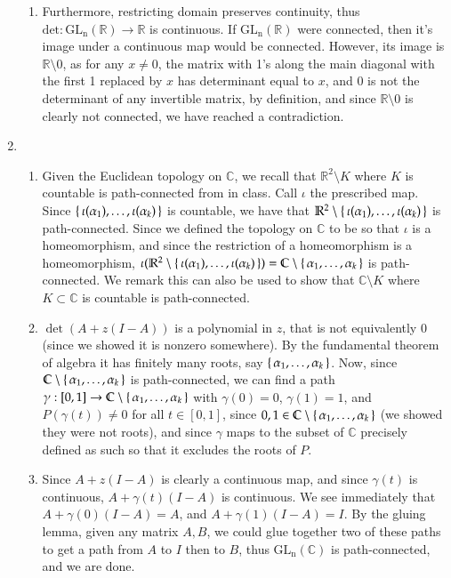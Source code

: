 \documentclass[12pt]{article}
\theoremstyle{definitionstyle}
\def\mbb#1{\mathbb{#1}}
\def \C{\mbb{C}}
\def \R{\mbb{R}}
\begin{document}
\begin{enumerate}[leftmargin=\labelsep]
\begin{enumerate}
			\item Furthermore, restricting domain preserves continuity, thus $\mathrm{det}: \mathrm{GL_n}(\R) \to \R$ is continuous. If $\mathrm{GL_n}(\R)$ were connected, then it's image under a continuous map would be connected. However, its image is $\R \setminus 0$, as for any $x \neq 0$, the matrix with 1's along the main diagonal with the first 1 replaced by $x$ has determinant equal to $x$, and 0 is not the determinant of any invertible matrix, by definition, and since $\R \setminus 0$ is clearly not connected, we have reached a contradiction.
		\end{enumerate}
		\item \begin{enumerate}
			\item Given the Euclidean topology on $\C$, we recall that $\R^2 \setminus K$ where $K$ is countable is path-connected from in class. Call $\iota$ the prescribed map. Since $\set{\iota(\alpha_1), \ldots, \iota(\alpha_k)}$ is countable, we have that $\R^2 \setminus \set{\iota(\alpha_1), \ldots, \iota(\alpha_k)}$ is path-connected. Since we defined the topology on $\C$ to be so that $\iota$ is a homeomorphism, and since the restriction of a homeomorphism is a homeomorphism, $\iota(\R^2 \setminus \set{\iota(\alpha_1), \ldots, \iota(\alpha_k)}) = \C \setminus \set{\alpha_1, \ldots, \alpha_k}$ is path-connected. We remark this can also be used to show that $\C \setminus K$ where $K \subset \C$ is countable is path-connected.
			
			\item $\det(A + z(I-A))$ is a polynomial in $z$, that is not equivalently 0 (since we showed it is nonzero somewhere). By the fundamental theorem of algebra it has finitely many roots, say $\set{\alpha_1, \ldots, \alpha_k}$. Now, since $\C \setminus \set{\alpha_1, \ldots, \alpha_k}$ is path-connected, we can find a path $\gamma: [0, 1] \to \C \setminus \set{\alpha_1, \ldots, \alpha_k}$ with $\gamma(0) = 0$, $\gamma(1) = 1$, and $P(\gamma(t)) \neq 0$ for all $t \in [0,1]$, since $0, 1 \in \C \setminus \set{\alpha_1, \ldots, \alpha_k}$ (we showed they were not roots), and since $\gamma$ maps to the subset of $\C$ precisely defined as such so that it excludes the roots of $P$.
			
			\item Since $A + z(I-A)$ is clearly a continuous map, and since $\gamma(t)$ is continuous, $A + \gamma(t)(I-A)$ is continuous. We see immediately that $A + \gamma(0)(I-A) = A$, and $A + \gamma(1)(I-A) = I$. By the gluing lemma, given any matrix $A, B$, we could glue together two of these paths to get a path from $A$ to $I$ then to $B$, thus $\mathrm{GL_n}(\C)$ is path-connected, and we are done.
		\end{enumerate}
	\end{enumerate}
\end{document}
